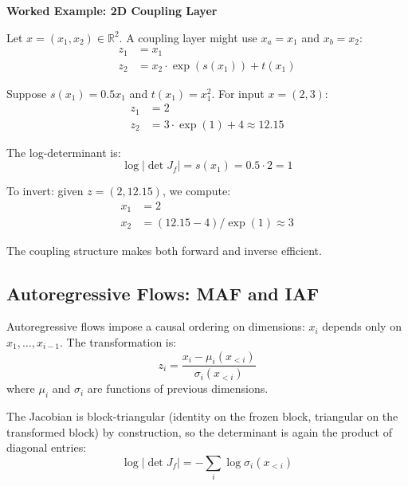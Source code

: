 \begin{examplebox}
\textbf{Worked Example: 2D Coupling Layer}

Let $x = (x_1, x_2) \in \mathbb{R}^2$. A coupling layer might use $x_a = x_1$ and $x_b = x_2$:
%
\begin{align*}
z_1 &= x_1 \\
z_2 &= x_2 \cdot \exp(s(x_1)) + t(x_1)
\end{align*}

Suppose $s(x_1) = 0.5 x_1$ and $t(x_1) = x_1^2$. For input $x = (2, 3)$:
%
\begin{align*}
z_1 &= 2 \\
z_2 &= 3 \cdot \exp(1) + 4 \approx 12.15
\end{align*}

The log-determinant is:
%
\begin{equation*}
\log |\det J_f| = s(x_1) = 0.5 \cdot 2 = 1
\end{equation*}

To invert: given $z = (2, 12.15)$, we compute:
%
\begin{align*}
x_1 &= 2 \\
x_2 &= (12.15 - 4) / \exp(1) \approx 3
\end{align*}

The coupling structure makes both forward and inverse efficient.
\end{examplebox}

\vspace{1.5em}

\subsection{Autoregressive Flows: MAF and IAF}

Autoregressive flows impose a causal ordering on dimensions: $x_i$ depends only on $x_1, \ldots, x_{i-1}$. The transformation is:
%
\begin{equation}
z_i = \frac{x_i - \mu_i(x_{<i})}{\sigma_i(x_{<i})}
\end{equation}
%
where $\mu_i$ and $\sigma_i$ are functions of previous dimensions.

\vspace{0.3cm}

The Jacobian is block-triangular (identity on the frozen block, triangular on the transformed block) by construction, so the determinant is again the product of diagonal entries:
%
\begin{equation}
\log |\det J_f| = -\sum_i \log \sigma_i(x_{<i})
\end{equation}


